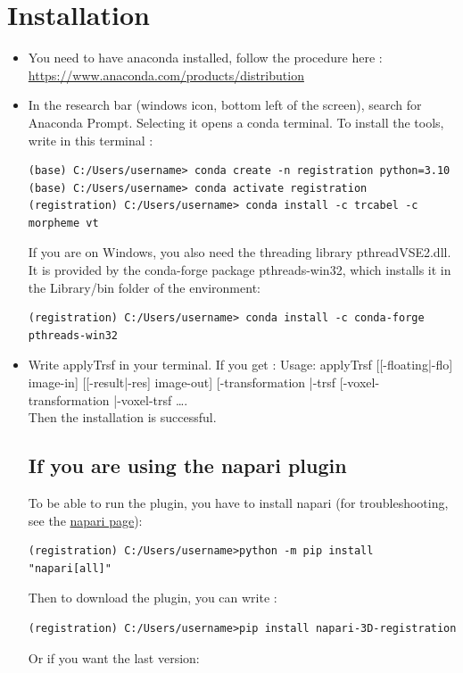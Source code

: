 \documentclass[11pt]{article}
\begin{document}
\section{Installation}
\begin{itemize}
\item[-] You need to have anaconda installed, follow the procedure here : \url{https://www.anaconda.com/products/distribution}
\item[-]In the research bar (windows icon, bottom left of the screen), search for Anaconda Prompt. Selecting it opens a conda terminal. To install the tools, write in this terminal :
\begin{verbatim}
(base) C:/Users/username> conda create -n registration python=3.10
(base) C:/Users/username> conda activate registration
(registration) C:/Users/username> conda install -c trcabel -c morpheme vt
\end{verbatim}

If you are on Windows, you also need the threading library pthreadVSE2.dll. It is provided by the conda-forge package pthreads-win32, which installs it in the Library/bin folder of the environment:
\begin{verbatim}
(registration) C:/Users/username> conda install -c conda-forge pthreads-win32
\end{verbatim}
\item[-]Write applyTrsf in your terminal. If you get :
Usage: applyTrsf [[-floating|-flo] image-in] [[-result|-res] image-out]
 [-transformation |-trsf %
 [-voxel-transformation |-voxel-trsf %
…. \\
Then the installation is successful.


\subsection{If you are using the napari plugin}

To be able to run the plugin, you have to install napari (for troubleshooting, see the \href{https:/napari.org/stable/}{napari page}):

\begin{verbatim}
(registration) C:/Users/username>python -m pip install "napari[all]"
\end{verbatim}
Then to download the plugin, you can write :
\begin{verbatim}
(registration) C:/Users/username>pip install napari-3D-registration
\end{verbatim}
Or if you want the last version:


\end{itemize}
\end{document}
